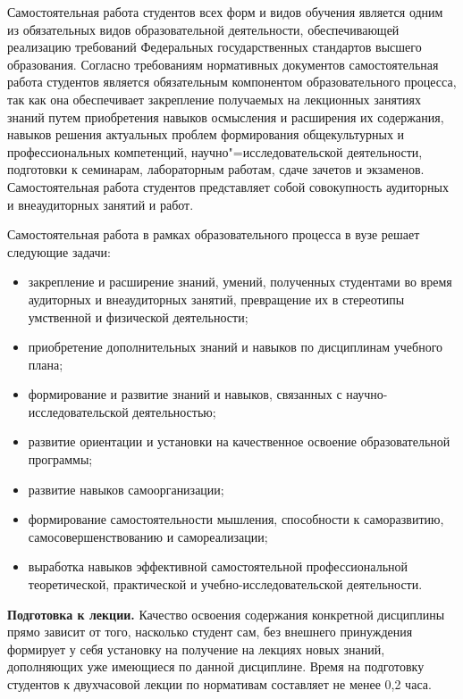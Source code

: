 \documentclass[12pt]{scrartcl}
\renewcommand{\paragraph}[1]{\par\textbf{#1}}
\begin{document}
Самостоятельная работа студентов всех форм и видов обучения является одним из
обязательных видов образовательной деятельности, обеспечивающей реализацию
требований Федеральных государственных стандартов высшего образования. Согласно
требованиям нормативных документов самостоятельная работа студентов является
обязательным компонентом образовательного процесса, так как она обеспечивает
закрепление получаемых на лекционных занятиях знаний путем приобретения навыков
осмысления и расширения их содержания, навыков решения актуальных проблем
формирования общекультурных и профессиональных компетенций, научно"=исследовательской деятельности, подготовки к семинарам, лабораторным работам, сдаче зачетов и экзаменов. Самостоятельная работа студентов представляет собой совокупность
аудиторных и внеаудиторных занятий и работ.

Самостоятельная работа в рамках
образовательного процесса в вузе решает следующие задачи:
\begin{itemize}
\item закрепление и расширение знаний, умений, полученных студентами во время
аудиторных и внеаудиторных занятий, превращение их в стереотипы умственной и
физической деятельности;
\item приобретение дополнительных знаний и навыков по дисциплинам учебного плана;
\item формирование и развитие знаний и навыков, связанных с научно-исследовательской
деятельностью;
\item развитие ориентации и установки на качественное освоение образовательной
программы;
\item развитие навыков самоорганизации;
\item формирование самостоятельности мышления, способности к саморазвитию,
самосовершенствованию и самореализации;
\item выработка навыков эффективной самостоятельной профессиональной теоретической,
  практической и учебно-исследовательской деятельности.
\end{itemize}

\paragraph{Подготовка к лекции.} Качество освоения содержания конкретной дисциплины
прямо зависит от того, насколько студент сам, без внешнего принуждения формирует у
себя установку на получение на лекциях новых знаний, дополняющих уже имеющиеся по
данной дисциплине. Время на подготовку студентов к двухчасовой лекции по нормативам
составляет не менее 0,2 часа.
\end{document}
